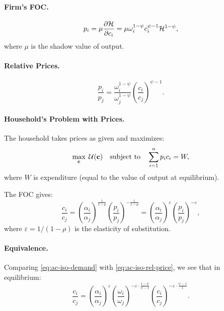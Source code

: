 \paragraph{Firm's FOC.}
\begin{equation}
p_i = \mu \frac{\partial \mathcal{H}}{\partial c_i} = \mu \omega_i^{1-\psi} c_i^{\psi-1} \mathcal{H}^{1-\psi},
\label{eq:ac-iso-firm-foc}
\end{equation}
where $\mu$ is the shadow value of output.

\paragraph{Relative Prices.}
\begin{equation}
\frac{p_i}{p_j} = \frac{\omega_i^{1-\psi}}{\omega_j^{1-\psi}} \left( \frac{c_i}{c_j} \right)^{\psi-1}.
\label{eq:ac-iso-rel-price}
\end{equation}

\paragraph{Household's Problem with Prices.}
The household takes prices as given and maximizes:
\begin{equation}
\max_{\mathbf{c}} \; \mathcal{U}(\mathbf{c}) \quad \text{subject to} \quad \sum_{i=1}^{n} p_i c_i = W,
\label{eq:ac-iso-hh-prices}
\end{equation}
where $W$ is expenditure (equal to the value of output at equilibrium).

The FOC gives:
\begin{equation}
\frac{c_i}{c_j} = \left( \frac{\alpha_i}{\alpha_j} \right)^{\frac{1}{1-\rho}} \left( \frac{p_i}{p_j} \right)^{-\frac{1}{1-\rho}} = \left( \frac{\alpha_i}{\alpha_j} \right)^{\varepsilon} \left( \frac{p_i}{p_j} \right)^{-\varepsilon},
\label{eq:ac-iso-demand}
\end{equation}
where $\varepsilon = 1/(1-\rho)$ is the elasticity of substitution.

\paragraph{Equivalence.}
Comparing \cref{eq:ac-iso-demand} with \cref{eq:ac-iso-rel-price}, we see that in equilibrium:
\begin{equation}
\frac{c_i}{c_j} = \left( \frac{\alpha_i}{\alpha_j} \right)^{\varepsilon} \left( \frac{\omega_i}{\omega_j} \right)^{-\varepsilon \cdot \frac{1-\psi}{\psi-1}} \left( \frac{c_i}{c_j} \right)^{-\varepsilon \cdot \frac{\psi-1}{1}}.
\label{eq:ac-iso-equilibrium}
\end{equation}

